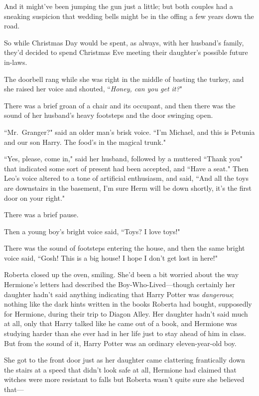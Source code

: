 And it might've been jumping the gun just a little; but both couples had a sneaking suspicion that wedding bells might be in the offing a few years down the road.

So while Christmas Day would be spent, as always, with her husband's family, they'd decided to spend Christmas Eve meeting their daughter's possible future in-laws.

The doorbell rang while she was right in the middle of basting the turkey, and she raised her voice and shouted, ``\emph{Honey, can you get it?}"

There was a brief groan of a chair and its occupant, and then there was the sound of her husband's heavy footsteps and the door swinging open.

``Mr.~Granger?" said an older man's brisk voice. ``I'm Michael, and this is Petunia and our son Harry. The food's in the magical trunk."

``Yes, please, come in," said her husband, followed by a muttered ``Thank you" that indicated some sort of present had been accepted, and ``Have a seat." Then Leo's voice altered to a tone of artificial enthusiasm, and said, ``And all the toys are downstairs in the basement, I'm sure Herm will be down shortly, it's the first door on your right."

There was a brief pause.

Then a young boy's bright voice said, ``Toys? I love toys!"

There was the sound of footsteps entering the house, and then the same bright voice said, ``Gosh! This is a big house! I hope I don't get lost in here!"

Roberta closed up the oven, smiling. She'd been a bit worried about the way Hermione's letters had described the Boy-Who-Lived---though certainly her daughter hadn't said anything indicating that Harry Potter was \emph{dangerous}; nothing like the dark hints written in the books Roberta had bought, supposedly for Hermione, during their trip to Diagon Alley. Her daughter hadn't said much at all, only that Harry talked like he came out of a book, and Hermione was studying harder than she ever had in her life just to stay ahead of him in class. But from the sound of it, Harry Potter was an ordinary eleven-year-old boy.

She got to the front door just as her daughter came clattering frantically down the stairs at a speed that didn't look safe at all, Hermione had claimed that witches were more resistant to falls but Roberta wasn't quite sure she believed that---

